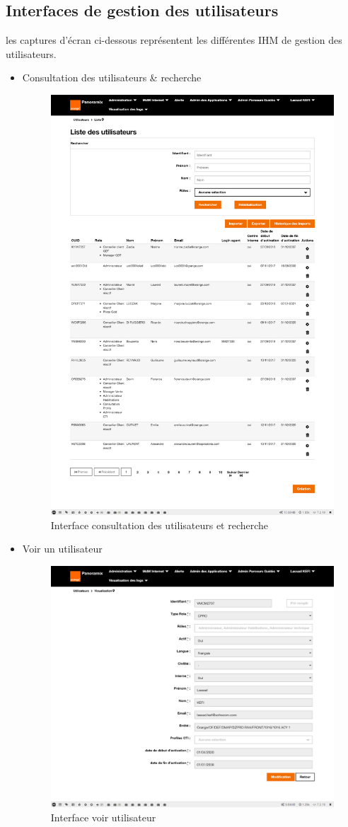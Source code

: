 \subsection[Interfaces de gestion des utilisateurs]{Interfaces de gestion des utilisateurs}
les captures d'écran ci-dessous représentent les différentes IHM de gestion des utilisateurs.
\begin{itemize}
	\item Consultation des utilisateurs \& recherche
	\begin{figure}[H]
		\centering
		\includegraphics[width=0.7\linewidth]{img/screenshots/users/consultation}
		\caption[Interface consultation des utilisateurs et recherche]{Interface consultation des utilisateurs et recherche}
		\label{fig:consultation-user}
	\end{figure}
	
	\item Voir un utilisateur
	\begin{figure}[H]
		\centering
		\includegraphics[width=0.65\linewidth]{img/screenshots/users/view}
		\caption[Interface voir utilisateur]{Interface voir utilisateur}
		\label{fig:view-user}
	\end{figure}


\end{itemize}
